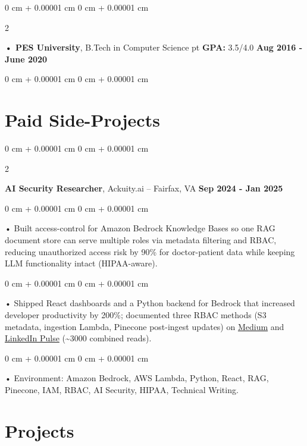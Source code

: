 \documentclass[10pt, letterpaper]{article}
\newenvironment{onecolentry}{
    \begin{adjustwidth}{
        0 cm + 0.00001 cm
    }{
        0 cm + 0.00001 cm
    }
}{
    \end{adjustwidth}
} %
\newenvironment{twocolentry}[2][]{
    \onecolentry
    \def\secondColumn{#2}
    \setcolumnwidth{\fill, 4.5 cm}
    \begin{paracol}{2}
}{
    \switchcolumn \raggedleft \secondColumn
    \end{paracol}
    \endonecolentry
} %
\begin{document}
        \begin{twocolentry}{
            \textbf{Aug 2016 - June 2020}
        }
            \textbf{ • PES University}, B.Tech in Computer Science  pt \textbf{GPA:} 3.5/4.0  \end{twocolentry}
        \begin{onecolentry}

                        \vspace{0.4cm}
    \section{Paid Side-Projects}
            \vspace{2 pt }
                    \begin{twocolentry}{
            \textbf{Sep 2024 - Jan 2025}
        }
            \textbf{AI Security Researcher}, Ackuity.ai -- Fairfax, VA\end{twocolentry}

        \begin{onecolentry}
             • Built access-control for Amazon Bedrock Knowledge Bases so one RAG document store can serve multiple roles via metadata filtering and RBAC, reducing unauthorized access risk by 90\% for doctor-patient data while keeping LLM functionality intact (HIPAA-aware).
        \end{onecolentry}
        \begin{onecolentry}
             • Shipped React dashboards and a Python backend for Bedrock that increased developer productivity by 200\%; documented three RBAC methods (S3 metadata, ingestion Lambda, Pinecone post-ingest updates) on \href{https://medium.com/@sreenikethaathreya/building-a-permission-aware-genai-application-on-amazon-bedrock-8fdc2410dd43}{Medium} and \href{https://www.linkedin.com/pulse/building-permission-aware-genai-application-amazon-bedrock-aathreya-g7nme/}{LinkedIn Pulse} (\textasciitilde 3000 combined reads).
        \end{onecolentry}
        \begin{onecolentry}
             • Environment: Amazon Bedrock, AWS Lambda, Python, React, RAG, Pinecone, IAM, RBAC, AI Security, HIPAA, Technical Writing.
        \end{onecolentry}
             \vspace{2 pt }

        \vspace{0.4cm}
        \vspace{0.4cm}
\section{Projects}
    \vspace{2 pt}
\end{onecolentry}
\end{document}
